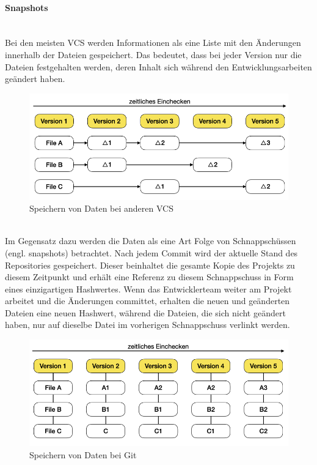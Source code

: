 \paragraph{Snapshots}\mbox{}\\
Bei den meisten VCS werden Informationen als eine Liste mit den Änderungen innerhalb der Dateien gespeichert. Das bedeutet, dass bei jeder Version nur die Dateien festgehalten werden, deren Inhalt sich während den Entwicklungsarbeiten geändert haben.

\begin{figure}[H]
\begin{center}
	\includegraphics[scale=.4]{images/other_vcs.png}
\end{center}
	\caption{Speichern von Daten bei anderen VCS}
\end{figure} 

\mbox{}\\Im Gegensatz dazu werden die Daten als eine Art Folge von Schnappschüssen (engl. snapshots) betrachtet. Nach jedem Commit wird der aktuelle Stand des Repositories gespeichert. Dieser beinhaltet die gesamte Kopie des Projekts zu diesem Zeitpunkt und erhält eine Referenz zu diesem Schnappschuss in Form eines einzigartigen Hashwertes. Wenn das Entwicklerteam weiter am Projekt arbeitet und die Änderungen committet, erhalten die neuen und geänderten Dateien eine neuen Hashwert, während die Dateien, die sich nicht geändert haben, nur auf dieselbe Datei im vorherigen Schnappschuss verlinkt werden.

\begin{figure}[H]
\begin{center}
	\includegraphics[scale=.4]{images/git_snapshot.png}
\end{center}
	\caption{Speichern von Daten bei Git}
\end{figure}

